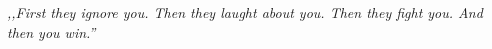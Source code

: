 \chapter*{}

\mbox{}

\textit{,,First they ignore you. Then they laught about you. Then
they fight you. And then you win.''}

